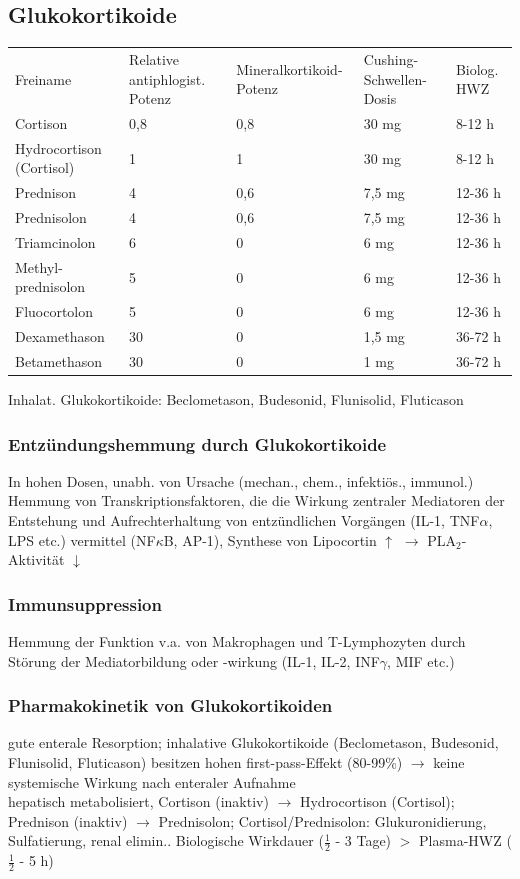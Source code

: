 \documentclass[10pt,a4paper]{report}
\begin{document}
\subsection{Glukokortikoide} %
\label{sub:glukokortikoide}
\begin{tabularx}{\textwidth}{XXXXX}
Freiname&Relative antiphlogist. Potenz&Mineralkortikoid-Potenz&Cushing-Schwellen-Dosis&Biolog. HWZ\\
Cortison&0,8&0,8&30 mg&8-12 h\\
Hydrocortison (Cortisol)&1&1&30 mg&8-12 h\\
Prednison&4&0,6&7,5 mg&12-36 h\\
Prednisolon&4&0,6&7,5 mg&12-36 h\\
Triamcinolon&6&0&6 mg&12-36 h\\
Methyl-prednisolon&5&0&6 mg&12-36 h\\
Fluocortolon&5&0&6 mg&12-36 h\\
Dexamethason&30&0&1,5 mg&36-72 h\\
Betamethason&30&0&1 mg&36-72 h\\
\end{tabularx}
Inhalat. Glukokortikoide: Beclometason, Budesonid, Flunisolid, Fluticason 
\subsubsection{Entzündungshemmung durch Glukokortikoide} %
\label{par:entz_ndungshemmung_durch_glukokortikoide}
In hohen Dosen, unabh. von Ursache (mechan., chem., infektiös., immunol.) Hemmung von Transkriptionsfaktoren, die die Wirkung zentraler Mediatoren der Entstehung und Aufrechterhaltung 
von entzündlichen Vorgängen (IL-1, TNF$\alpha$, LPS etc.) vermittel (NF$\kappa$B, AP-1), Synthese von Lipocortin $\uparrow$ $\rightarrow$ PLA$_2$-Aktivität $\downarrow$
\subsubsection{Immunsuppression} %
\label{par:immunsuppression}
Hemmung der Funktion  v.a. von Makrophagen und T-Lymphozyten durch Störung der Mediatorbildung oder -wirkung (IL-1, IL-2, INF$\gamma$, MIF etc.)
\subsubsection{Pharmakokinetik von Glukokortikoiden} %
\label{par:pharmakokinetik_von_glukokortikoiden}
gute enterale Resorption; inhalative Glukokortikoide (Beclometason, Budesonid, Flunisolid, Fluticason) besitzen hohen first-pass-Effekt (80-99\%) $\rightarrow$ keine systemische Wirkung nach enteraler Aufnahme\\
hepatisch metabolisiert, Cortison (inaktiv) $\rightarrow$ Hydrocortison (Cortisol); Prednison (inaktiv) $\rightarrow$ Prednisolon; Cortisol/Prednisolon: Glukuronidierung, Sulfatierung, renal  elimin.. Biologische Wirkdauer ($\frac{1}{2}$ - 3 Tage) $>$ Plasma-HWZ ($\frac{1}{2} $ - 5 h)
\end{document}
